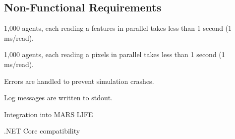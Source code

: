 \subsection{Non-Functional Requirements}
\reqstartNF
	\item 1,000 agents, each reading a features in parallel takes less than 1 second (1 ms/read).
	\item 1,000 agents, each reading a pixels in parallel takes less than 1 second (1 ms/read).
	\item Errors are handled to prevent simulation crashes.
	\item Log messages are written to stdout.
	\item Integration into MARS LIFE
	\item .NET Core compatibility
\reqendNF
